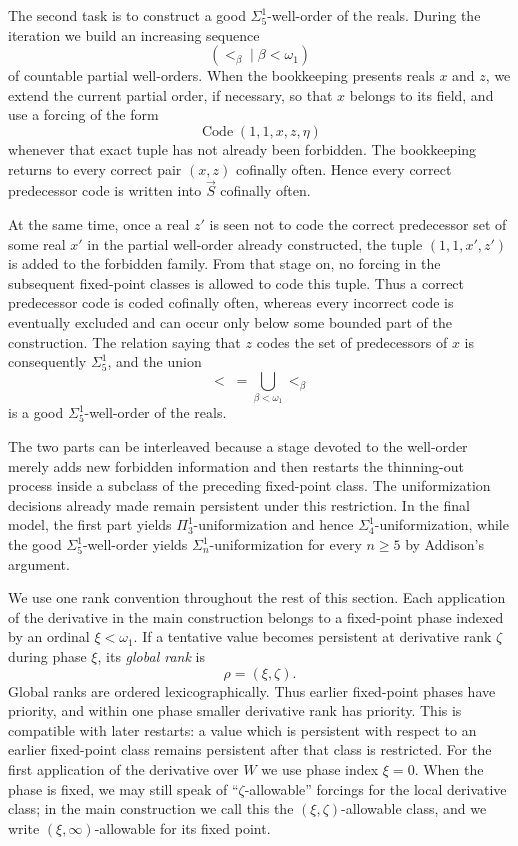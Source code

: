 \documentclass[a4paper,11pt]{article}
\begin{document}
The second task is to construct a good $\Sigma^1_5$-well-order of the reals. During the iteration we build an increasing sequence
\[
(<_\beta\mid\beta<\omega_1)
\]
of countable partial well-orders. When the bookkeeping presents reals $x$ and $z$, we extend the current partial order, if necessary, so that $x$ belongs to its field, and use a forcing of the form
\[
\operatorname{Code}(1,1,x,z,\eta)
\]
whenever that exact tuple has not already been forbidden. The bookkeeping returns to every correct pair $(x,z)$ cofinally often. Hence every correct predecessor code is written into $\vec S$ cofinally often.

At the same time, once a real $z'$ is seen not to code the correct predecessor set of some real $x'$ in the partial well-order already constructed, the tuple $(1,1,x',z')$ is added to the forbidden family.  From that stage on, no forcing in the subsequent fixed-point classes is allowed to code this tuple.  Thus a correct predecessor code is coded cofinally often, whereas every incorrect code is eventually excluded and can occur only below some bounded part of the construction.  The relation saying that $z$ codes the set of predecessors of $x$ is consequently $\Sigma^1_5$, and the union
\[
<\;=\bigcup_{\beta<\omega_1}<_\beta
\]
is a good $\Sigma^1_5$-well-order of the reals.

The two parts can be interleaved because a stage devoted to the well-order merely adds new forbidden information and then restarts the thinning-out process inside a subclass of the preceding fixed-point class.  The uniformization decisions already made remain persistent under this restriction.  In the final model, the first part yields $\Pi^1_3$-uniformization and hence $\Sigma^1_4$-uniformization, while the good $\Sigma^1_5$-well-order yields $\Sigma^1_n$-uniformization for every $n\geq5$ by Addison's argument.

We use one rank convention throughout the rest of this section. Each application of the derivative in the main construction belongs to a fixed-point phase indexed by an ordinal $\xi<\omega_1$. If a tentative value becomes persistent at derivative rank $\zeta$ during phase $\xi$, its \emph{global rank} is
\[
\rho=(\xi,\zeta).
\]
Global ranks are ordered lexicographically. Thus earlier fixed-point phases have priority, and within one phase smaller derivative rank has priority. This is compatible with later restarts: a value which is persistent with respect to an earlier fixed-point class remains persistent after that class is restricted. For the first application of the derivative over $W$ we use phase index $\xi=0$. When the phase is fixed, we may still speak of ``$\zeta$-allowable'' forcings for the local derivative class; in the main construction we call this the $(\xi,\zeta)$-allowable class, and we write $(\xi,\infty)$-allowable for its fixed point.
\end{document}

